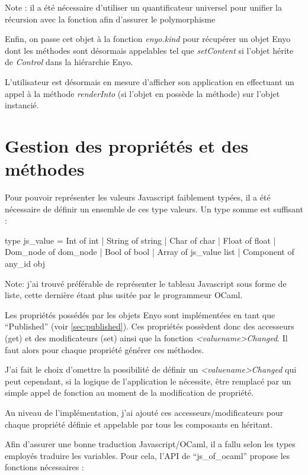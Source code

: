 \documentclass[11pt,a4paper]{report}
\begin{document}
Note : il a été nécessaire d'utiliser un quantificateur universel pour unifier la récursion 
avec la fonction afin d'assurer le polymorphisme\\\medskip

Enfin, on passe cet objet à la fonction \emph{enyo.kind} pour récupérer un objet Enyo
dont les méthodes sont désormais appelables tel que \emph{setContent} si l'objet hérite 
de \emph{Control} dans la hiérarchie Enyo.

L'utilisateur est désormais en mesure d'afficher son application en effectuant un appel
à la méthode \emph{renderInto} (si l'objet en possède la méthode) sur l'objet instancié.

\section{Gestion des propriétés et des méthodes}\label{gestprop}

Pour pouvoir représenter les valeurs Javascript faiblement typées, il a été nécessaire de définir un 
ensemble de ces type valeurs. Un type somme est suffisant :

\begin{OCaml}
    type js_value = Int of int | String of string 
                  | Char of char | Float of float 
                  | Dom_node of dom_node | Bool of bool 
                  | Array of js_value list | Component of any_id obj 
\end{OCaml}

Note: j'ai trouvé préférable de représenter le tableau Javascript sous forme de liste,
cette dernière étant plus usitée par le programmeur OCaml.\medskip

Les propriétés possédés par les objets Enyo sont implémentées en tant que ``Published'' 
(voir \ref{sec:published}). Ces propriétés possèdent donc des accesseurs (get) et des modificateurs (set) ainsi
que la fonction \emph{<valuename>Changed}. Il faut alors pour chaque propriété générer ces méthodes.

J'ai fait le choix d'omettre la possibilité de définir un \emph{<valuename>Changed} qui peut cependant,
si la logique de l'application le nécessite, être remplacé par un simple appel de fonction au moment
de la modification de propriété.

Au niveau de l'implémentation, j'ai ajouté ces accesseurs/modificateurs pour chaque propriété définie 
et appelable par tous les composants en héritant.

Afin d'assurer une bonne traduction Javascript/OCaml, il a fallu selon les types employés traduire
les variables. Pour cela, l'API de ``js\_of\_ocaml'' propose les fonctions nécessaires :
\end{document}
